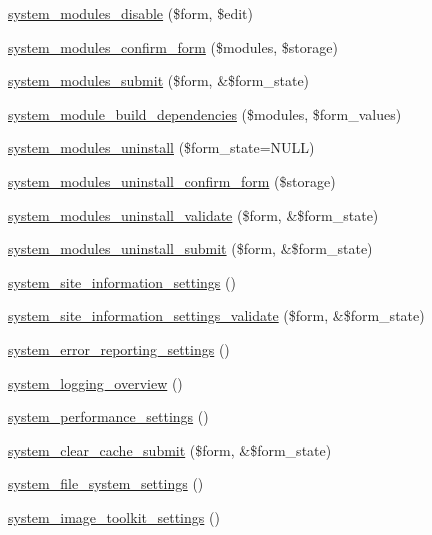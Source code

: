 \begin{CompactItemize}
\item 
\hyperlink{group__forms_ga1c6a106e2cb1667b9aff6986c875fb1}{system\_\-modules\_\-disable} (\$form, \$edit)
\item 
\hyperlink{group__forms_g253f61674ab19c32b0df811c365ae00c}{system\_\-modules\_\-confirm\_\-form} (\$modules, \$storage)
\item 
\hyperlink{system_8admin_8inc_b5e3e0148d76ec1bfe7e441d4ff56146}{system\_\-modules\_\-submit} (\$form, \&\$form\_\-state)
\item 
\hyperlink{system_8admin_8inc_17907af33561392a7fae5630b9a850c6}{system\_\-module\_\-build\_\-dependencies} (\$modules, \$form\_\-values)
\item 
\hyperlink{group__forms_g6719870584aaef3fa06f2d0c2392daf1}{system\_\-modules\_\-uninstall} (\$form\_\-state=NULL)
\item 
\hyperlink{group__forms_g3006c568c437410b5fedb4c6d68ddbf4}{system\_\-modules\_\-uninstall\_\-confirm\_\-form} (\$storage)
\item 
\hyperlink{system_8admin_8inc_043bb0ba8fa3b299202ffee8d63e9fca}{system\_\-modules\_\-uninstall\_\-validate} (\$form, \&\$form\_\-state)
\item 
\hyperlink{system_8admin_8inc_a4fa94b5401ff21e77b711edf0e196c4}{system\_\-modules\_\-uninstall\_\-submit} (\$form, \&\$form\_\-state)
\item 
\hyperlink{group__forms_g80e6b3130e47d51243151f1aa04742a3}{system\_\-site\_\-information\_\-settings} ()
\item 
\hyperlink{system_8admin_8inc_bf9e67e3196d40a164cfacba18613b28}{system\_\-site\_\-information\_\-settings\_\-validate} (\$form, \&\$form\_\-state)
\item 
\hyperlink{group__forms_gc3d206af540977bb598cae42759491bc}{system\_\-error\_\-reporting\_\-settings} ()
\item 
\hyperlink{system_8admin_8inc_7d827c89cc40bcc621fcb97310cdc5a6}{system\_\-logging\_\-overview} ()
\item 
\hyperlink{group__forms_g47b1f34bfff2f44fd22cfc866bff59d7}{system\_\-performance\_\-settings} ()
\item 
\hyperlink{group__forms_g07cc959f377e07b079d9875fc5c4b1b7}{system\_\-clear\_\-cache\_\-submit} (\$form, \&\$form\_\-state)
\item 
\hyperlink{group__forms_gb0199bde08bcb49ff536dd4987718632}{system\_\-file\_\-system\_\-settings} ()
\item 
\hyperlink{group__forms_gefe85833f426aa428f4ac75d641d7631}{system\_\-image\_\-toolkit\_\-settings} ()

\end{CompactItemize}
